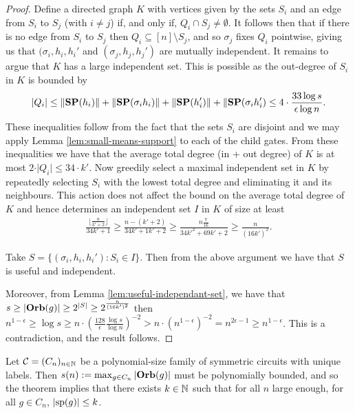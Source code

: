 \documentclass[../paper.tex]{subfiles}
\begin{document}
\begin{proof}
  Define a directed graph $K$ with vertices given by the sets $S_i$ and an edge
  from $S_i$ to $S_j$ (with $i \neq j$) if, and only if, $Q_i \cap S_j \neq
  \emptyset$. It follows then that if there is no edge from $S_i$ to $S_j$ then
  $Q_i \subseteq [n]\setminus S_j$, and so $\sigma_j$ fixes $Q_i$ pointwise,
  giving us that $(\sigma_i, h_i, h_i'$ and $(\sigma_j, h_j, h_j')$ are mutually
  independent. It remains to argue that $K$ has a large independent set. This is
  possible as the out-degree of $S_i$ in $K$ is bounded by
  \begin{align*}
    \vert Q_i \vert \leq \|\text{\textbf{SP}}(h_i) \| + \|\text{\textbf{SP}}(\sigma_i h_i) \| + \|\text{\textbf{SP}}(h_i') \| + \|\text{\textbf{SP}}(\sigma_i h_i') \leq 4 \cdot \frac{33\log s}{\epsilon \log n}.
  \end{align*}
  These inequalities follow from the fact that the sets $S_i$ are disjoint and
  we may apply Lemma \ref{lem:small-means-support} to each of the child gates.
  From these inequalities we have that the average total degree (in + out
  degree) of $K$ is at most $2 \cdot \vert Q_i \vert \leq 34 \cdot k'$. Now
  greedily select a maximal independent set in $K$ by repeatedly selecting $S_i$
  with the lowest total degree and eliminating it and its neighbours. This
  action does not affect the bound on the average total degree of $K$ and hence
  determines an independent set $I$ in $K$ of size at least
  \begin{align*}
    \frac{\lfloor \frac{n}{k' + 2} \rfloor}{34k' + 1} \geq \frac{n - (k'+2)}{34k'+1k'+2} \geq \frac{n\frac{7}{16}}{34k'^2 + 69k' +2} \geq \frac{n}{(16k')^2}.
  \end{align*}

  Take $S = \{(\sigma_i, h_i, h_i') : S_i \in I \}$. Then from the above
  argument we have that $S$ is useful and independent.
  
  Moreover, from Lemma \ref{lem:useful-independant-set}, we have that $s \geq
  \vert \text{\textbf{Orb}}(g) \vert \geq 2^{\vert S \vert} \geq 2^{\frac{n}{(16k')^2}}$ then
  $n^{1-\epsilon} \geq \log s \geq n \cdot (\frac{128}{\epsilon}\frac{\log
    s}{\log n})^{-2} > n \cdot (n^{1-\epsilon})^{-2} = n^{2\epsilon -1} \geq
  n^{1-\epsilon}$. This is a contradiction, and the result follows.
\end{proof}
 
Let $\mathcal{C} = (C_n)_{n \in \mathbb{N}}$ be a polynomial-size family of symmetric
circuits with unique labels. Then $s(n) := \max_{g \in C_n} \vert \text{\textbf{Orb}} (g)\vert$
must be polynomially bounded, and so the theorem implies that there exists $k
\in \mathbb{N}$ such that for all $n$ large enough, for all $g \in C_n$, $\vert
\text{sp}(g) \vert \leq k$.
\end{document}
